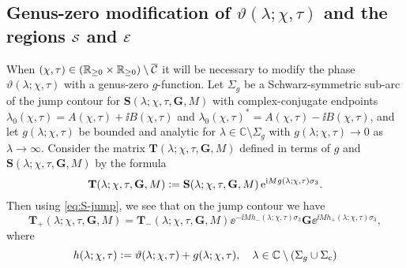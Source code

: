 \subsection{Genus-zero modification of $\vartheta(\lambda;\chi,\tau)$ and the regions $\mathcal{S}$ and $\mathcal{E}$}
\label{sec:h-intro}
When $(\chi,\tau)\in (\mathbb{R}_{\ge 0}\times\mathbb{R}_{\ge 0})\setminus\overline{\mathcal{C}}$ it will be necessary to modify the phase $\vartheta(\lambda;\chi,\tau)$ with a genus-zero $g$-function.  Let $\Sigma_g$ be a Schwarz-symmetric sub-arc of 
the jump contour for $\mathbf{S}(\lambda;\chi,\tau,\mathbf{G},M)$ with complex-conjugate endpoints $\lambda_0(\chi,\tau)=A(\chi,\tau)+\ii B(\chi,\tau)$ and $\lambda_0(\chi,\tau)^*=A(\chi,\tau)-\ii B(\chi,\tau)$, and let $g(\lambda;\chi,\tau)$ be bounded and analytic for $\lambda\in\mathbb{C}\setminus\Sigma_g$ with $g(\lambda;\chi,\tau)\to 0$ as $\lambda\to\infty$.  
Consider the matrix $\mathbf{T}(\lambda;\chi,\tau,\mathbf{G},M)$ defined in terms of $g$ and $\mathbf{S}(\lambda;\chi,\tau,\mathbf{G},M)$
by the formula
\begin{equation}
\mathbf{T}(\lambda;\chi,\tau,\mathbf{G},M)\vcentcolon=\mathbf{S}(\lambda;\chi,\tau,\mathbf{G},M)\,\mathrm{e}^{\mathrm{i} Mg(\lambda;\chi,\tau)\sigma_3}.
\label{eq:T-to-S}
\end{equation}
Then using \eqref{eq:S-jump}, we see that on the jump contour we have
\begin{equation}
\mathbf{T}_+(\lambda;\chi,\tau,\mathbf{G},M)=\mathbf{T}_-(\lambda;\chi,\tau,\mathbf{G},M)\ee^{-\ii Mh_-(\lambda;\chi,\tau)\sigma_3}%
\mathbf{G}
\ee^{\ii Mh_+(\lambda;\chi,\tau)\sigma_3},
\label{eq:T-jump}
\end{equation}
where
\begin{equation}
h(\lambda;\chi,\tau)\vcentcolon= \vartheta(\lambda;\chi,\tau)+g(\lambda;\chi,\tau),\quad\lambda\in\mathbb{C}\setminus(\Sigma_g\cup\Sigma_\mathrm{c})
\label{eq:h-define}
\end{equation}
